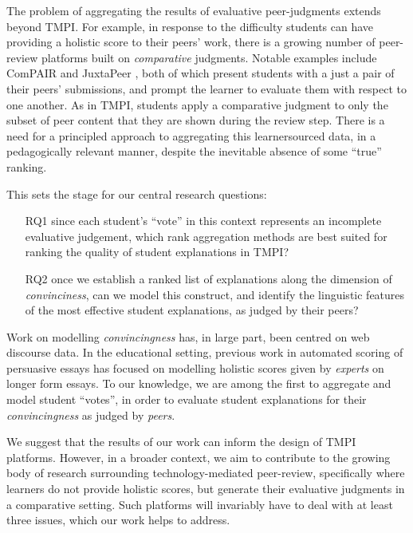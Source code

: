 \documentclass[notitlepage,12pt]{jedm}
\begin{document}
The problem of aggregating the results of evaluative peer-judgments extends  
beyond TMPI.
For example, in response to the difficulty students can have providing a 
holistic score to their peers' work, there is a growing number of peer-review 
platforms built on \textit{comparative} judgments.
Notable examples include ComPAIR \cite{potter_compair:_2017} and 
JuxtaPeer \cite{cambre_juxtapeer:_2018}, both of which present students with a 
just a pair of their peers' submissions, and prompt the learner to evaluate 
them with respect to one another.
As in TMPI, students apply a comparative judgment to only the subset of peer 
content that they are shown during the review step.
There is a need for a principled approach to aggregating this learnersourced 
data, in a pedagogically relevant manner, despite the inevitable absence of 
some ``true'' ranking.

This sets the stage for our central research questions: 
\begin{itemize}
	\item[RQ1] since each student's ``vote'' in this context represents an 
	incomplete evaluative judgement, which rank aggregation 
	methods are best suited for ranking the quality of student 
	explanations in TMPI?
	\item[RQ2] once we establish a ranked list of explanations along the 
	dimension of \textit{convinciness}, can we model this construct, and 
	identify the linguistic features of the most effective student 
	explanations, as judged by their peers?
\end{itemize}

Work on modelling \textit{convincingness} has, in large part, been centred on 
web discourse data.
In the educational setting, previous work in automated scoring of persuasive 
essays has focused on modelling holistic scores given by \textit{experts} on 
longer form essays.
To our knowledge, we are among the first to aggregate and model student 
``votes'', in order to evaluate student explanations for their 
\textit{convincingness} as judged by \textit{peers}.

We suggest that the results of our work can inform the design of TMPI platforms.
However, in a broader context, we aim to contribute to the growing body of 
research surrounding technology-mediated peer-review, specifically where 
learners do not provide holistic scores, but generate their evaluative 
judgments in a comparative setting. 
Such platforms will invariably have to deal with at least three issues, which 
our work helps to address.
\end{document}
